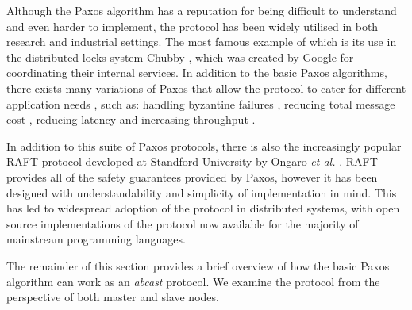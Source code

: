 		Although the Paxos algorithm has a reputation for being difficult to understand and even harder to implement, the protocol has been widely utilised in both research and industrial settings.  The most famous example of which is its use in the distributed locks system Chubby \citep{Burrows:2006:CLS:1298455.1298487}, which was created by Google for coordinating their internal services.  In addition to the basic Paxos algorithms, there exists many variations of Paxos that allow the protocol to cater for different application needs \citep{DBLP:journals/corr/MarandiBPB14}, such as: handling byzantine failures \citep{DBLP:conf/wdag/Lamport11a}, reducing total message cost \citep{DBLP:conf/dsn/LamportM04}, reducing latency \citep{DBLP:journals/dc/Lamport06} and increasing throughput \citep{marandi2010ring, Santos:2012:TPH:2183677.2183688}.  
		
		In addition to this suite of Paxos protocols, there is also the increasingly popular RAFT protocol developed at Standford University by Ongaro \emph{et al.} \citep{Ongaro:2014:SUC:2643634.2643666}.  RAFT provides all of the safety guarantees provided by Paxos, however it has been designed with understandability and simplicity of implementation in mind.  This has led to widespread adoption of the protocol in distributed systems, with open source implementations of the protocol now available for the majority of mainstream programming languages.  
		
		The remainder of this section provides a brief overview of how the basic Paxos algorithm can work as an \emph{abcast} protocol.  We examine the protocol from the perspective of both master and slave nodes.  
		
